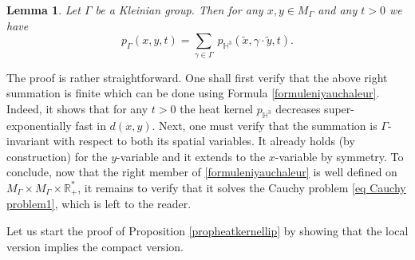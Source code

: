 \documentclass[JEP,XML,SOM,Unicode,NoFloatCountersInSection,published]{cedram}
\theoremstyle{plain}
\newtheorem{lemma}[equation]{Lemma}
\theoremstyle{definition}
\newcommand{\HH}{\mathbb{H}}
\newcommand{\RR}{\mathbb{R}}
\newcommand{\somme}[1]{\sum_{#1}}
\begin{document}
\begin{lemma}
\label{lemheatkernelseries}
Let $\Gamma$ be a Kleinian group. Then for any $x, y \in M_{\Gamma}$ and any $t > 0$ we have
\[
p_{\Gamma}(x,y,t) = \somme{\gamma \in \Gamma} \ p_{\HH^3}(\tilde{x},\gamma \cdot \tilde{y},t).
\]
\end{lemma}

The proof is rather straightforward. One shall first verify that the above right summation is finite which can be done using Formula \ref{formuleniyauchaleur}. Indeed, it shows that for any $t > 0$ the heat kernel $p_{\HH^3}$ decreases super-exponentially fast in $d(x,y)$. Next, one must verify that the summation is $\Gamma$-invariant with respect to both its spatial variables. It already holds (by construction) for the $y$-variable and it extends to the $x$-variable by symmetry. To conclude, now that the right member of \eqref{formuleniyauchaleur} is well defined on $M_{\Gamma} \times M_{\Gamma} \times \RR_+^*$, it remains to verify that it solves the Cauchy problem \eqref{eq Cauchy problem1}, which is left to the reader.

Let us start the proof of Proposition \ref{propheatkernellip} by showing that the local version implies the compact version.
\end{document}
